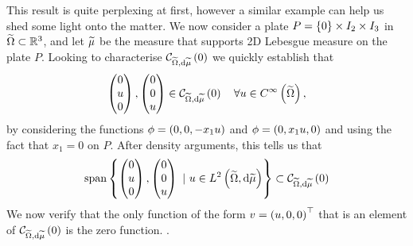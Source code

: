 This result is quite perplexing at first, however a similar example can help us shed some light onto the matter.
We now consider a plate $P = \left\{ 0 \right\}\times I_2\times I_3$ in $\widetilde{\Omega}\subset\mathbb{R}^3$, and let $\widetilde{\mu}$ be the measure that supports 2D Lebesgue measure on the plate $P$.
Looking to characterise $\mathcal{C}_{ \widetilde{\Omega}, \mathrm{d}\widetilde{\mu}}\left( 0 \right)$ we quickly establish that
\begin{align*}
	\begin{pmatrix} 0 \\ u \\ 0 \end{pmatrix}, \begin{pmatrix} 0 \\ 0 \\ u \end{pmatrix}
	\in \mathcal{C}_{ \widetilde{\Omega}, \mathrm{d}\widetilde{\mu}}\left( 0 \right) \quad \forall u\in C^{\infty}\left( \widetilde{\Omega} \right),
\end{align*}
by considering the functions $\phi=\left( 0, 0, -x_1 u \right)$ and $\phi=\left( 0, x_1 u, 0 \right)$ and using the fact that $x_1=0$ on $P$.
After density arguments, this tells us that
\begin{align*}
	 \mathrm{span}\left\{ 
	 \begin{pmatrix} 0 \\ u \\ 0 \end{pmatrix}, \begin{pmatrix} 0 \\ 0 \\ u \end{pmatrix}
	 \ \vert \ u\in L^{2}\left( \widetilde{\Omega},\mathrm{d}\widetilde{\mu} \right)
	  \right\}\subset \mathcal{C}_{ \widetilde{\Omega}, \mathrm{d}\widetilde{\mu}}\left( 0 \right)
\end{align*}
We now verify that the only function of the form $v=\left( u,0,0 \right)^\top$ that is an element of $\mathcal{C}_{ \widetilde{\Omega}, \mathrm{d}\widetilde{\mu}}\left( 0 \right)$ is the zero function. .

